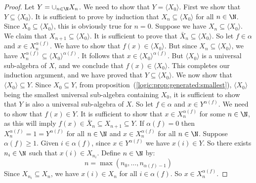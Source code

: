 \begin{proof}
Let $Y=\cup_{n\in\N}X_{n}$. We need to show that $Y=\langle
X_{0}\rangle$. First we show that $Y\subseteq \langle X_{0}\rangle$.
It is sufficient to prove by induction that $X_{n}\subseteq\langle
X_{0}\rangle$ for all $n\in\N$. Since $X_{0}\subseteq \langle
X_{0}\rangle$, this is obviously true for $n=0$. Suppose we have
$X_{n}\subseteq \langle X_{0}\rangle$. We claim that
$X_{n+1}\subseteq\langle X_{0}\rangle$. It is sufficient to prove
that $\bar{X}_{n}\subseteq\langle X_{0}\rangle$. So let $f\in\alpha$
and $x\in X_{n}^{\alpha(f)}$. We have to show that $f(x)\in\langle
X_{0}\rangle$. But since $X_{n}\subseteq\langle X_{0}\rangle$, we
have $X_{n}^{\alpha(f)}\subseteq\langle X_{0}\rangle^{\alpha(f)}$.
It follows that $x\in\langle X_{0}\rangle^{\alpha(f)}$. But $\langle
X_{0}\rangle$ is a universal sub-algebra of $X$, and we conclude
that $f(x)\in\langle X_{0}\rangle$. This completes our induction
argument, and we have proved that $Y\subseteq \langle X_{0}\rangle$.
We now show that $\langle X_{0}\rangle\subseteq Y$. Since
$X_{0}\subseteq Y$, from
proposition~(\ref{logic:prop:generated:smallest}), $\langle
X_{0}\rangle$ being the smallest universal sub-algebra containing
$X_{0}$, it is sufficient to show that $Y$ is also a universal
sub-algebra of $X$. So let $f\in\alpha$ and $x\in Y^{\alpha(f)}$. We
need to show that $f(x)\in Y$.  It is sufficient to show that $x\in
X_{n}^{\alpha(f)}$ for some $n\in\N$, as this will imply
$f(x)\in\bar{X}_{n}\subseteq X_{n+1}\subseteq Y$. If $\alpha(f)=0$
then $X_{n}^{\alpha(f)}=1=Y^{\alpha(f)}$ for all $n\in\N$ and $x\in
X_{n}^{\alpha(f)}$ for all $n\in\N$. Suppose $\alpha(f)\geq 1$.
Given $i\in\alpha(f)$, since $x\in Y^{\alpha(f)}$ we have $x(i)\in
Y$. So there exists $n_{i}\in\N$ such that $x(i)\in X_{n_{i}}$.
Define $n\in\N$ by:
     \[
     n=\max(n_{0},\ldots,n_{\alpha(f)-1})
     \]
Since $X_{n_{i}}\subseteq X_{n}$, we have $x(i)\in X_{n}$ for all $i\in\alpha(f)$.
So $x\in X_{n}^{\alpha(f)}$.
\end{proof}
